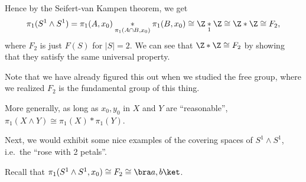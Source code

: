 \documentclass[a4paper]{article}
\begin{document}
\begin{eg}
  Hence by the Seifert-van Kampen theorem, we get
  \[
    \pi_1(S^1 \wedge S^1) = \pi_1(A, x_0)\underset{\pi_1(A\cap B, x_0)}{*} \pi_1(B, x_0) \cong \Z \underset{1}{*} \Z \cong \Z * \Z \cong F_2,
  \]
  where $F_2$ is just $F(S)$ for $|S| = 2$. We can see that $\Z*\Z \cong F_2$ by showing that they satisfy the same universal property.

  Note that we have already figured this out when we studied the free group, where we realized $F_2$ is the fundamental group of this thing.

  More generally, as long as $x_0, y_0$ in $X$ and $Y$ are ``reasonable'', $\pi_1(X\wedge Y) \cong \pi_1(X) * \pi_1(Y)$.
\end{eg}

Next, we would exhibit some nice examples of the covering spaces of $S^1 \wedge S^1$, i.e.\ the ``rose with 2 petals''.

Recall that $\pi_1(S^1 \wedge S^1, x_0) \cong F_2 \cong \bra a, b\ket$.
\end{document}
